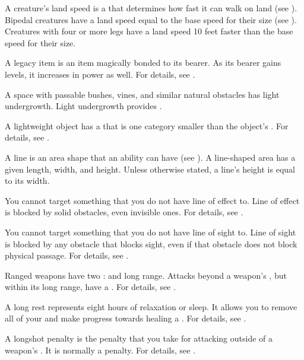 A creature's land speed is a  that determines how fast it can walk on land (see ).
Bipedal creatures have a land speed equal to the base speed for their size (see ).
Creatures with four or more legs have a land speed 10 feet faster than the base speed for their size.

 A legacy item is an item magically bonded to its bearer.
As its bearer gains levels, it increases in power as well.
For details, see .

 A space with passable bushes, vines, and similar natural obstacles has light undergrowth.
Light undergrowth provides .

 A lightweight object has a  that is one category smaller than the object's .
For details, see .

 A line is an area shape that an ability can have (see ).
A line-shaped area has a given length, width, and height.
Unless otherwise stated, a line's height is equal to its width.

 You cannot target something that you do not have line of effect to.
Line of effect is blocked by solid obstacles, even invisible ones.
For details, see .

 You cannot target something that you do not have line of sight to.
Line of sight is blocked by any obstacle that blocks sight, even if that obstacle does not block physical passage.
For details, see .

 Ranged weapons have two :  and long range.
Attacks beyond a weapon's , but within its long range, have a  .
For details, see .

 A long rest represents eight hours of relaxation or sleep.
It allows you to remove all of your  and make progress towards healing a .
For details, see .

 A longshot penalty is the penalty that you take for attacking outside of a weapon's .
It is normally a   penalty.
For details, see .


